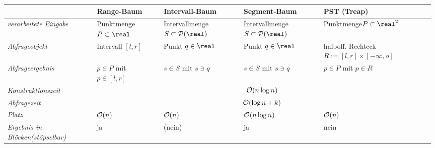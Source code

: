 {\footnotesize
\begin{tabular}{p{32mm}p{29mm}p{29mm}p{29mm}p{29mm}}
    \toprule
    &
    \textbf{Range-Baum}&
    \textbf{Intervall-Baum}&
    \textbf{Segment-Baum}&
    \textbf{PST (Treap)}\\

    \midrule
    \emph{verarbeitete Eingabe}&
    Punktmenge\newline$P \subset \real$&
    Intervallmenge\newline$S \subset \P(\real)$&
    Intervallmenge\newline$S \subset \P(\real)$&
    Punktmenge\newline$P \subset \real^2$\\

    \midrule
    \emph{Abfrageobjekt}&
    Intervall $[l, r]$&
    Punkt $q \in \real$&
    Punkt $q \in \real$&
    halboff. Rechteck\newline$R := [l, r] \times [-\infty, o]$\\

    \midrule
    \emph{Abfrageergebnis}&
    $p \in P$ mit $p \in [l, r]$&
    $s \in S$ mit $s \ni q$&
    $s \in S$ mit $s \ni q$&
    $p \in P$ mit $p \in R$\\

    \midrule
    \emph{Konstruktionszeit}&
    \multicolumn{4}{c}{$\mathcal{O}(n \log n)$}\\

    \midrule
    \emph{Abfragezeit}&
    \multicolumn{4}{c}{$\mathcal{O}(\log n + k)$}\\

    \midrule
    \emph{Platz}&
    $\mathcal{O}(n)$&
    $\mathcal{O}(n)$&
    $\mathcal{O}(n \log n)$&
    $\mathcal{O}(n)$\\

    \midrule
    \emph{Ergebnis in Blöcken\newline(stöpselbar)}&
    ja&
    (nein)&
    ja&
    nein\\

    \bottomrule
\end{tabular}}

\pagebreak
